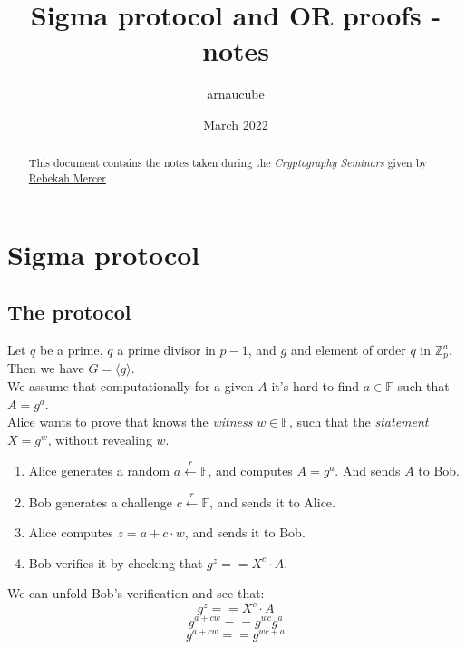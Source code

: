 \documentclass{article}
\title{Sigma protocol and OR proofs - notes}
\author{arnaucube}
\date{March 2022}
\theoremstyle{definition}
\begin{document}
\maketitle

\begin{abstract}
	This document contains the notes taken during the \emph{Cryptography Seminars} given by \href{https://github.com/rbkhmrcr}{Rebekah Mercer}.
\end{abstract}

\tableofcontents

\section{Sigma protocol}

\subsection{The protocol}
Let $q$ be a prime, $q$ a prime divisor in $p-1$, and $g$ and element of order $q$ in $\mathbb{Z}_p^a$. Then we have $G = \langle g \rangle$.
\\
We assume that computationally for a given $A$ it's hard to find $a \in \mathbb{F}$ such that $A = g^a$.
\\
Alice wants to prove that knows the \emph{witness} $w \in \mathbb{F}$, such that the \emph{statement} $X = g^w$, without revealing $w$.

\begin{enumerate}[1.]
	\item Alice generates a random $a \xleftarrow{r} \mathbb{F}$, and computes $A=g^a$. And sends $A$ to Bob.
	\item Bob generates a challenge $c \xleftarrow{r} \mathbb{F}$, and sends it to Alice.
	\item Alice computes $z=a + c \cdot w$, and sends it to Bob.
	\item Bob verifies it by checking that $g^z == X^c \cdot A$.
\end{enumerate}

We can unfold Bob's verification and see that:
$$g^z == X^c \cdot A$$
$$g^{a+cw} == g^{wc} g^a$$
$$g^{a+cw} == g^{wc+a}$$

\begin{center}
\begin{sequencediagram}
\end{sequencediagram}
\end{center}
\end{document}
